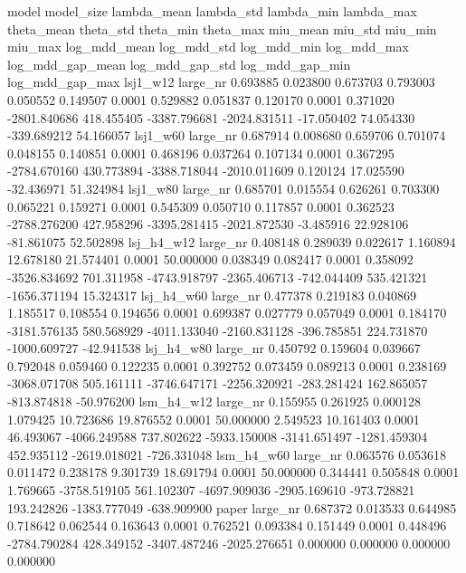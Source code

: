        model model_size  lambda_mean  lambda_std  lambda_min  lambda_max  theta_mean  theta_std  theta_min  theta_max  miu_mean   miu_std  miu_min   miu_max  log_mdd_mean  log_mdd_std  log_mdd_min  log_mdd_max  log_mdd_gap_mean  log_mdd_gap_std  log_mdd_gap_min  log_mdd_gap_max
    lsj1_w12   large_nr     0.693885    0.023800    0.673703    0.793003    0.050552   0.149507     0.0001   0.529882  0.051837  0.120170   0.0001  0.371020  -2801.840686   418.455405 -3387.796681 -2024.831511        -17.050402        74.054330      -339.689212        54.166057
    lsj1_w60   large_nr     0.687914    0.008680    0.659706    0.701074    0.048155   0.140851     0.0001   0.468196  0.037264  0.107134   0.0001  0.367295  -2784.670160   430.773894 -3388.718044 -2010.011609          0.120124        17.025590       -32.436971        51.324984
    lsj1_w80   large_nr     0.685701    0.015554    0.626261    0.703300    0.065221   0.159271     0.0001   0.545309  0.050710  0.117857   0.0001  0.362523  -2788.276200   427.958296 -3395.281415 -2021.872530         -3.485916        22.928106       -81.861075        52.502898
  lsj_h4_w12   large_nr     0.408148    0.289039    0.022617    1.160894   12.678180  21.574401     0.0001  50.000000  0.038349  0.082417   0.0001  0.358092  -3526.834692   701.311958 -4743.918797 -2365.406713       -742.044409       535.421321     -1656.371194        15.324317
  lsj_h4_w60   large_nr     0.477378    0.219183    0.040869    1.185517    0.108554   0.194656     0.0001   0.699387  0.027779  0.057049   0.0001  0.184170  -3181.576135   580.568929 -4011.133040 -2160.831128       -396.785851       224.731870     -1000.609727       -42.941538
  lsj_h4_w80   large_nr     0.450792    0.159604    0.039667    0.792048    0.059460   0.122235     0.0001   0.392752  0.073459  0.089213   0.0001  0.238169  -3068.071708   505.161111 -3746.647171 -2256.320921       -283.281424       162.865057      -813.874818       -50.976200
  lsm_h4_w12   large_nr     0.155955    0.261925    0.000128    1.079425   10.723686  19.876552     0.0001  50.000000  2.549523 10.161403   0.0001 46.493067  -4066.249588   737.802622 -5933.150008 -3141.651497      -1281.459304       452.935112     -2619.018021      -726.331048
  lsm_h4_w60   large_nr     0.063576    0.053618    0.011472    0.238178    9.301739  18.691794     0.0001  50.000000  0.344441  0.505848   0.0001  1.769665  -3758.519105   561.102307 -4697.909036 -2905.169610       -973.728821       193.242826     -1383.777049      -638.909900
       paper   large_nr     0.687372    0.013533    0.644985    0.718642    0.062544   0.163643     0.0001   0.762521  0.093384  0.151449   0.0001  0.448496  -2784.790284   428.349152 -3407.487246 -2025.276651          0.000000         0.000000         0.000000         0.000000
